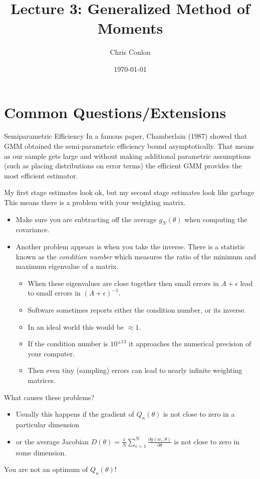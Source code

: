 \documentclass[aspectratio=169]{beamer}
\title{Lecture 3: Generalized Method of Moments}
\author{Chris Conlon }
\institute{NYU Stern }
\date{\today}
\begin{document}
\maketitle


\section*{\normalsize  Common Questions/Extensions}

\begin{frame}{Semiparametric Efficiency}
In a famous paper, Chamberlain (1987) showed that GMM obtained the semi-parametric efficiency bound asymptotically. That means as our sample gets large and without making additional parametric assumptions (such as placing distributions on error terms) the efficient GMM provides the most efficient estimator.
\end{frame}

\begin{frame}{My first stage estimates look ok, but my second stage estimates look like garbage}
This means there is a problem with your weighting matrix. 
\begin{itemize}
\item Make sure you are subtracting off the average $g_N(\theta)$ when computing the covariance. 
\item Another problem appears is when you take the inverse. There is a statistic known as the \textit{condition number} which measures the ratio of the minimum and maximum eigenvalue of a matrix.
\begin{itemize}
\item When these eigenvalues are close together then small errors in $A+\epsilon$ lead to small errors in $(A+\epsilon)^{-1}$.
\item Software sometimes reports either the condition number, or its inverse.
\item In an ideal world this would be $\approx 1$. 
\item If the condition number is $10^{\pm 13}$ it approaches the numerical precision of your computer. 
\item Then even tiny (sampling) errors can lead to nearly infinite weighting matrices.
\end{itemize}
\end{itemize}
\end{frame}

\begin{frame}{What causes these problems?}
\begin{itemize}
\item Usually this happens if the gradient of $Q_n(\theta)$ is not close to zero in a particular dimension 
\item or the average Jacobian $D(\theta)=\frac{1}{N} \sum_{i=1}^N \frac{\partial g(w_i,\theta)}{\partial \theta}$ is not close to zero in some dimension.
\end{itemize}
You are not an optimum of $Q_n(\theta)$!
\end{frame}
\end{document}
